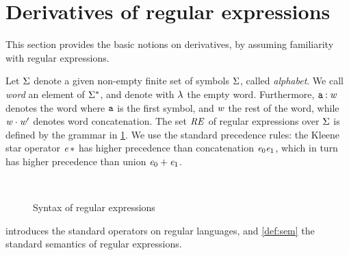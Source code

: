 \section{Derivatives of regular expressions}\label{sec:der}

This section provides the basic notions on derivatives, by assuming familiarity with regular expressions.

Let $\Sigma$ denote a given non-empty finite set of symbols $\Sigma$, called \emph{alphabet}. We call \emph{word} an element of $\Sigma^*$, and denote with $\lambda$ the empty word. Furthermore, $\mathtt {a}\mathbin{:}\mathit {w}$ denotes the word where $\mathtt {a}$ is the first symbol, and $\mathit {w}$ the rest of the word, while $\mathit {w}\mathbin{\cdot}\mathit {w}'$ denotes word concatenation.
The set $\mathit {RE}$ of regular expressions over $\Sigma$ is defined by the grammar in \cref{fig:syn}. We use the standard precedence rules: the Kleene star operator ${{\mathit {e}}\mathop{*}}$  has higher precedence than concatenation $\mathit {e}_0\mathit {e}_1$, which in turn has higher precedence than union $\mathit {e}_0\mathbin{+}\mathit {e}_1$.
\begin{figure}[h]
 \begin{small}
  \begin{center}
   \begin{grammar}
     \\
   \end{grammar}
  \end{center}
 \end{small}
 \caption{Syntax of regular expressions}
 \label{fig:syn}
\end{figure}

 introduces the standard operators on regular languages, and \cref{def:sem} the standard semantics of regular expressions.

\begin{definition}\label[definition]{def:sem}
 \[
  \begin{array}{l}
   \sem{\none}=\emptyset\quad \sem{\eps}=\{\emptyWord\} \quad \sem{\sym}=\{\sym\} \quad
   \sem{\re_0\catop\re_1}=\sem{\re_0}\strcatop\sem{\re_1} \quad \sem{\re_0\orop\re_1}=\sem{\re_0}\cup\sem{\re_1} \\ \sem{\starop{\re_0}}=\starop{\sem{\re_0}}
  \end{array}
 \]
\end{definition}

